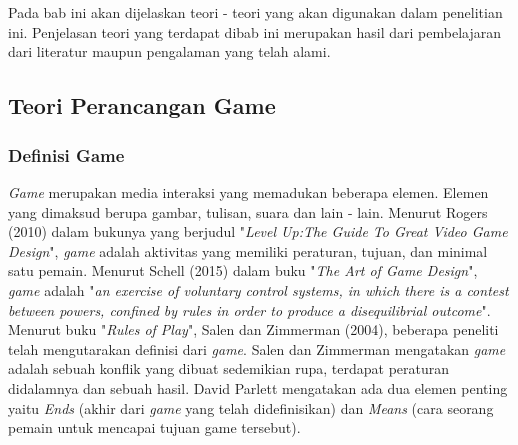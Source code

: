 \chapter{\babDua}
Pada bab ini akan dijelaskan teori - teori yang akan digunakan \saya dalam penelitian ini. Penjelasan teori yang terdapat dibab ini merupakan hasil dari pembelajaran \saya dari literatur maupun pengalaman yang telah \saya alami.
\section{Teori Perancangan Game}
	\subsection{Definisi Game}
	\textit{Game} merupakan media interaksi yang memadukan beberapa elemen. Elemen yang dimaksud berupa gambar, tulisan, suara dan lain - lain. Menurut Rogers (2010) dalam bukunya yang berjudul "\textit{Level Up:The Guide To Great Video Game Design}", \textit{game} adalah aktivitas yang memiliki peraturan, tujuan, dan minimal satu pemain. Menurut Schell (2015) dalam buku "\textit{The Art of Game Design}", \textit{game} adalah "\textit{an exercise of voluntary control systems, in which there is a contest between powers, confined by rules in order to produce a disequilibrial outcome}".
	\linebreak\linebreak
	Menurut buku "\textit{Rules of Play}", Salen dan Zimmerman (2004), beberapa peneliti telah mengutarakan definisi dari \textit{game}. Salen dan Zimmerman mengatakan \textit{game} adalah sebuah konflik yang dibuat sedemikian rupa, terdapat peraturan didalamnya dan sebuah hasil. David Parlett mengatakan ada dua elemen penting yaitu \textit{Ends} (akhir dari  \textit{game} yang telah didefinisikan) dan \textit{Means} (cara seorang pemain untuk mencapai tujuan game tersebut).
